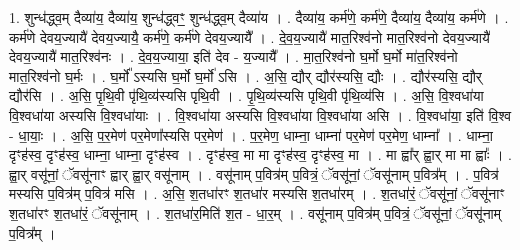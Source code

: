\documentclass[17pt]{extarticle}
\begin{document}
1. शुन्ध॑द्ध्व॒म् दैव्या॑य॒ दैव्या॑य॒ शुन्ध॑द्ध्वꣳ॒॒ शुन्ध॑द्ध्व॒म् दैव्या॑य । . दैव्या॑य॒ कर्म॑णे॒ कर्म॑णे॒ दैव्या॑य॒ दैव्या॑य॒ कर्म॑णे । . कर्म॑णे देवय॒ज्यायै॑ देवय॒ज्यायै॒ कर्म॑णे॒ कर्म॑णे देवय॒ज्यायै᳚ । . दे॒व॒य॒ज्यायै॑ मात॒रिश्व॑नो मात॒रिश्व॑नो देवय॒ज्यायै॑ देवय॒ज्यायै॑ मात॒रिश्व॑नः । . दे॒व॒य॒ज्याया॒ इति॑ देव - य॒ज्यायै᳚ । . मा॒त॒रिश्व॑नो घ॒र्मो घ॒र्मो मा॑त॒रिश्व॑नो मात॒रिश्व॑नो घ॒र्मः । . घ॒र्मो᳚ ऽस्यसि घ॒र्मो घ॒र्मो॑ ऽसि । . अ॒सि॒ द्यौर् द्यौर॑स्यसि॒ द्यौः । . द्यौर॑स्यसि॒ द्यौर् द्यौर॑सि । . अ॒सि॒ पृ॒थि॒वी पृ॑थि॒व्य॑स्यसि पृथि॒वी । . पृ॒थि॒व्य॑स्यसि पृथि॒वी पृ॑थि॒व्य॑सि । . अ॒सि॒ वि॒श्वधा॑या वि॒श्वधा॑या अस्यसि वि॒श्वधा॑याः । . वि॒श्वधा॑या अस्यसि वि॒श्वधा॑या वि॒श्वधा॑या असि । . वि॒श्वधा॑या॒ इति॑ वि॒श्व - धा॒याः॒ । . अ॒सि॒ प॒र॒मेण॑ पर॒मेणा᳚स्यसि पर॒मेण॑ । . प॒र॒मेण॒ धाम्ना॒ धाम्ना॑ पर॒मेण॑ पर॒मेण॒ धाम्ना᳚ । . धाम्ना॒ दृꣳह॑स्व॒ दृꣳह॑स्व॒ धाम्ना॒ धाम्ना॒ दृꣳह॑स्व । . दृꣳह॑स्व॒ मा मा दृꣳह॑स्व॒ दृꣳह॑स्व॒ मा । . मा ह्वा᳚र् ह्वा॒र् मा मा ह्वाः᳚ । . ह्वा॒र् वसू॑नां॒ ॅवसू॑नाꣳ ह्वार् ह्वा॒र् वसू॑नाम् । . वसू॑नाम् प॒वित्र॑म् प॒वित्रं॒ ॅवसू॑नां॒ ॅवसू॑नाम् प॒वित्र᳚म् । . प॒वित्र॑ मस्यसि प॒वित्र॑म् प॒वित्र॑ मसि । . अ॒सि॒ श॒तधा॑रꣳ श॒तधा॑र मस्यसि श॒तधा॑रम् । . श॒तधा॑रं॒ ॅवसू॑नां॒ ॅवसू॑नाꣳ श॒तधा॑रꣳ श॒तधा॑रं॒ ॅवसू॑नाम् । . श॒तधा॑र॒मिति॑ श॒त - धा॒र॒म् । . वसू॑नाम् प॒वित्र॑म् प॒वित्रं॒ ॅवसू॑नां॒ ॅवसू॑नाम् प॒वित्र᳚म् । \newline
\end{document}
